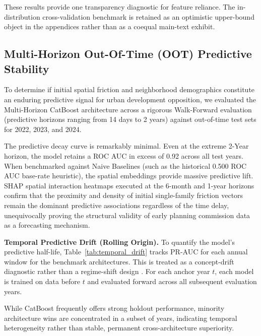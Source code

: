\documentclass[11pt, letterpaper]{article}
\begin{document}
\vspace{1em}

These results provide one transparency diagnostic for feature reliance. The in-distribution cross-validation benchmark is retained as an optimistic upper-bound object in the appendices rather than as a coequal main-text exhibit.

\subsection{Multi-Horizon Out-Of-Time (OOT) Predictive Stability}

To determine if initial spatial friction and neighborhood demographics constitute an enduring predictive signal for urban development opposition, we evaluated the Multi-Horizon CatBoost architecture across a rigorous Walk-Forward evaluation (predictive horizons ranging from 14 days to 2 years) against out-of-time test sets for 2022, 2023, and 2024. 

The predictive decay curve is remarkably minimal. Even at the extreme 2-Year horizon, the model retains a ROC AUC in excess of 0.92 across all test years. When benchmarked against Naive Baselines (such as the historical 0.500 ROC AUC base-rate heuristic), the spatial embeddings provide massive predictive lift. SHAP spatial interaction heatmaps executed at the 6-month and 1-year horizons confirm that the proximity and density of initial single-family friction vectors remain the dominant predictive associations regardless of the time delay, unequivocally proving the structural validity of early planning commission data as a forecasting mechanism.



\vspace{1em}
\textbf{Temporal Predictive Drift (Rolling Origin).} To quantify the model's predictive half-life, Table~\ref{tab:temporal_drift} tracks PR-AUC for each annual window for the benchmark architectures. This is treated as a concept-drift diagnostic rather than a regime-shift design \cite{gama2014conceptdrift}. For each anchor year $t$, each model is trained on data before $t$ and evaluated forward across all subsequent evaluation years.

While CatBoost frequently offers strong holdout performance, minority architecture wins are concentrated in a subset of years, indicating temporal heterogeneity rather than stable, permanent cross-architecture superiority.
\end{document}
